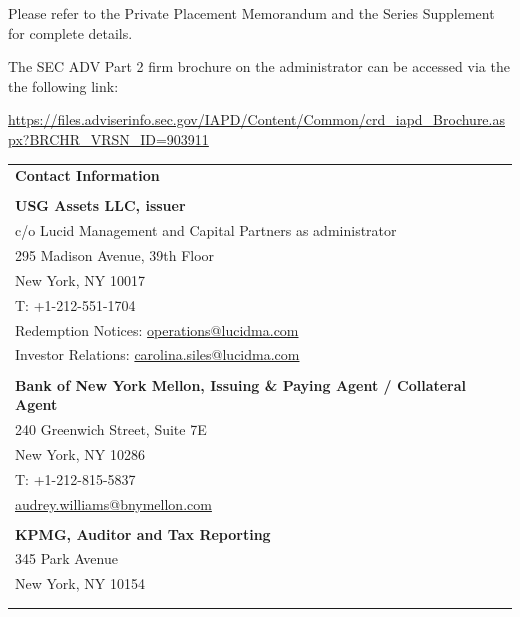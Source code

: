 \documentclass[9pt]{article}
\begin{document}
\noindent Please refer to the Private Placement Memorandum and the Series Supplement for complete details. 

{\color{gray} \noindent The SEC ADV Part 2 firm brochure on the administrator can be accessed via the the following link:

\noindent\underline{https://files.adviserinfo.sec.gov/IAPD/Content/Common/crd\_iapd\_Brochure.aspx?BRCHR\_VRSN\_ID=903911}}

\begin{center}\noindent\begin{tabular}{p{\textwidth}}
\rowcolor{lucid_blue} 
{\color[HTML]{FFFFFF} \textbf{Contact Information}} \\
\rowcolor[HTML]{EFEFEF} 
 \\
\rowcolor[HTML]{EFEFEF} 
\textbf{USG Assets LLC, issuer} \\
\rowcolor[HTML]{EFEFEF} 
 c/o Lucid Management and Capital Partners as administrator\\
\rowcolor[HTML]{EFEFEF} 
 295 Madison Avenue, 39th Floor\\
\rowcolor[HTML]{EFEFEF} 
 New York, NY 10017\\
\rowcolor[HTML]{EFEFEF} 
 T: +1-212-551-1704\\
\rowcolor[HTML]{EFEFEF} 
 Redemption Notices: \underline{operations@lucidma.com}\\
\rowcolor[HTML]{EFEFEF} 
 Investor Relations: \underline{carolina.siles@lucidma.com}\\
\rowcolor[HTML]{EFEFEF} 
 \\
\rowcolor[HTML]{EFEFEF} 
\textbf{Bank of New York Mellon, Issuing \& Paying Agent / Collateral Agent} \\
\rowcolor[HTML]{EFEFEF} 
 240 Greenwich Street, Suite 7E\\
\rowcolor[HTML]{EFEFEF} 
 New York, NY 10286\\
\rowcolor[HTML]{EFEFEF} 
 T: +1-212-815-5837\\
\rowcolor[HTML]{EFEFEF} 
 \underline{audrey.williams@bnymellon.com}\\
\rowcolor[HTML]{EFEFEF} 
 \\
\rowcolor[HTML]{EFEFEF} 
 \textbf{KPMG, Auditor and Tax Reporting}\\
\rowcolor[HTML]{EFEFEF} 
 345 Park Avenue\\
\rowcolor[HTML]{EFEFEF} 
 New York, NY 10154\\
\rowcolor[HTML]{EFEFEF} 
 \\
\rowcolor[HTML]{EFEFEF} 

\end{tabular}
\end{center}
\end{document}
